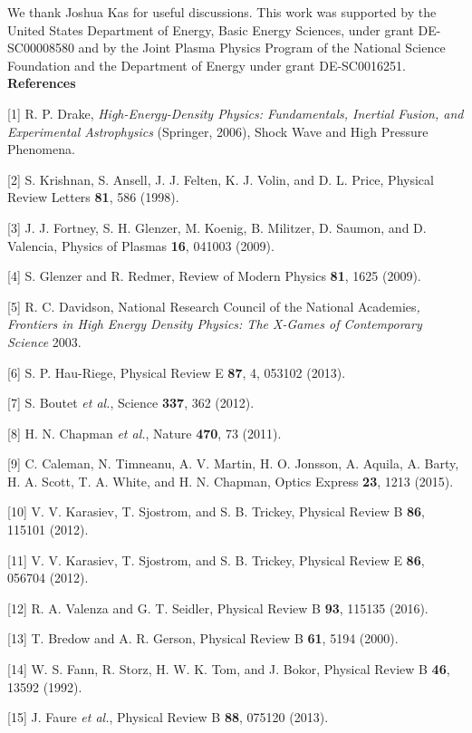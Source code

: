 We thank Joshua Kas for useful discussions. This work was supported by
the United States Department of Energy, Basic Energy Sciences, under
grant DE-SC00008580 and by the Joint Plasma Physics Program of the
National Science Foundation and the Department of Energy under grant
DE-SC0016251. \textbf{\\References}

{[}1{]} R. P. Drake, \emph{High-Energy-Density Physics: Fundamentals,
Inertial Fusion, and Experimental Astrophysics} (Springer, 2006), Shock
Wave and High Pressure Phenomena.

{[}2{]} S. Krishnan, S. Ansell, J. J. Felten, K. J. Volin, and D. L.
Price, Physical Review Letters \textbf{81}, 586 (1998).

{[}3{]} J. J. Fortney, S. H. Glenzer, M. Koenig, B. Militzer, D. Saumon,
and D. Valencia, Physics of Plasmas \textbf{16}, 041003 (2009).

{[}4{]} S. Glenzer and R. Redmer, Review of Modern Physics \textbf{81},
1625 (2009).

{[}5{]} R. C. Davidson, National Research Council of the National
Academies\emph{,} \emph{Frontiers in High Energy Density Physics: The
X-Games of Contemporary Science} 2003.

{[}6{]} S. P. Hau-Riege, Physical Review E \textbf{87}, 4, 053102
(2013).

{[}7{]} S. Boutet \emph{et al.}, Science \textbf{337}, 362 (2012).

{[}8{]} H. N. Chapman \emph{et al.}, Nature \textbf{470}, 73 (2011).

{[}9{]} C. Caleman, N. Timneanu, A. V. Martin, H. O. Jonsson, A. Aquila,
A. Barty, H. A. Scott, T. A. White, and H. N. Chapman, Optics Express
\textbf{23}, 1213 (2015).

{[}10{]} V. V. Karasiev, T. Sjostrom, and S. B. Trickey, Physical Review
B \textbf{86}, 115101 (2012).

{[}11{]} V. V. Karasiev, T. Sjostrom, and S. B. Trickey, Physical Review
E \textbf{86}, 056704 (2012).

{[}12{]} R. A. Valenza and G. T. Seidler, Physical Review B \textbf{93},
115135 (2016).

{[}13{]} T. Bredow and A. R. Gerson, Physical Review B \textbf{61}, 5194
(2000).

{[}14{]} W. S. Fann, R. Storz, H. W. K. Tom, and J. Bokor, Physical
Review B \textbf{46}, 13592 (1992).

{[}15{]} J. Faure \emph{et al.}, Physical Review B \textbf{88}, 075120
(2013).

